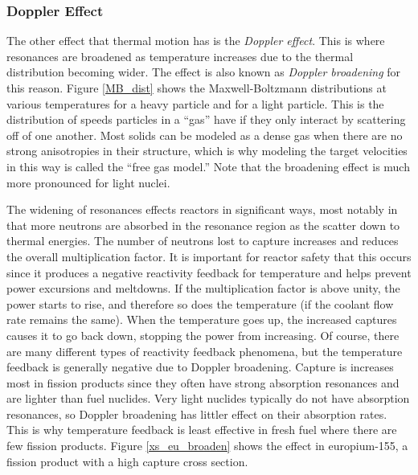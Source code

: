 \subsubsection{Doppler Effect}


The other effect that thermal motion has is the \emph{Doppler effect}.  This is where resonances are broadened as temperature increases due to the thermal distribution becoming wider.  The effect is also known as \emph{Doppler broadening} for this reason.  Figure \ref{MB_dist} shows the Maxwell-Boltzmann distributions at various temperatures for a heavy particle and for a light particle.  This is the distribution of speeds particles in a ``gas'' have if they only interact by scattering off of one another.  Most solids can be modeled as a dense gas when there are no strong anisotropies in their structure, which is why modeling the target velocities in this way is called the ``free gas model.''  Note that the broadening effect is much more pronounced for light nuclei.  

The widening of resonances effects reactors in significant ways, most notably in that more neutrons are absorbed in the resonance region as the scatter down to thermal energies.  The number of neutrons lost to capture increases and reduces the overall multiplication factor.  It is important for reactor safety that this occurs since it produces a negative reactivity feedback for temperature and helps prevent power excursions and meltdowns.  If the multiplication factor is above unity, the power starts to rise, and therefore so does the temperature (if the coolant flow rate remains the same).  When the temperature goes up, the increased captures causes it to go back down, stopping the power from increasing.  Of course, there are many different types of reactivity feedback phenomena, but the temperature feedback is generally negative due to Doppler broadening.  Capture is increases most in fission products since they often have strong absorption resonances and are lighter than fuel nuclides.  Very light nuclides typically do not have absorption resonances, so Doppler broadening has littler effect on their absorption rates.  This is why temperature feedback is least effective in fresh fuel where there are few fission products.  Figure \ref{xs_eu_broaden} shows the effect in europium-155, a fission product with a high capture cross section.

